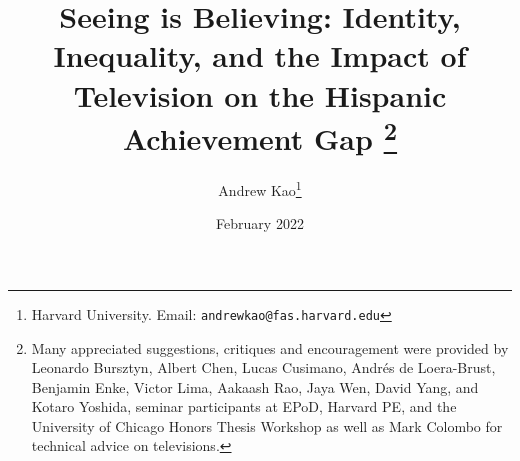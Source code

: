 \documentclass[11pt]{article}
\begin{document}
\title{\textbf{Seeing is Believing: Identity, Inequality, and the Impact of Television on the Hispanic Achievement Gap}%
\thanks{Many appreciated suggestions, critiques and encouragement were provided by Leonardo Bursztyn, Albert Chen, Lucas Cusimano, Andrés de Loera-Brust, Benjamin Enke, Victor Lima, Aakaash Rao, Jaya Wen, David Yang, and Kotaro Yoshida, seminar participants at EPoD, Harvard PE, and the University of Chicago Honors Thesis Workshop as well as Mark Colombo for technical advice on televisions. }\\
}



\author{Andrew Kao\thanks{Harvard University. Email: \texttt{andrewkao@fas.harvard.edu}} }

\date{February 2022}
{\vspace{-5ex}}


\maketitle
\end{document}
